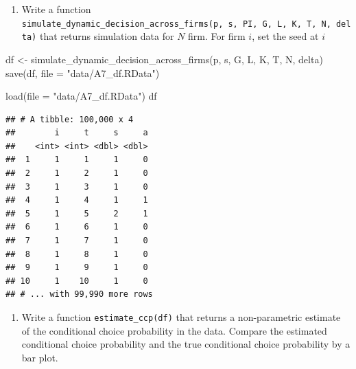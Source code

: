 \documentclass[
]{book}
\newenvironment{Shaded}{\begin{snugshade}}{\end{snugshade}}
\newcommand{\AttributeTok}[1]{\textcolor[rgb]{0.77,0.63,0.00}{#1}}
\newcommand{\FunctionTok}[1]{\textcolor[rgb]{0.00,0.00,0.00}{#1}}
\newcommand{\NormalTok}[1]{#1}
\newcommand{\OtherTok}[1]{\textcolor[rgb]{0.56,0.35,0.01}{#1}}
\newcommand{\StringTok}[1]{\textcolor[rgb]{0.31,0.60,0.02}{#1}}
\providecommand{\tightlist}{%
  \setlength{\itemsep}{0pt}\setlength{\parskip}{0pt}}
\begin{document}
\begin{enumerate}
\def\labelenumi{\arabic{enumi}.}
\setcounter{enumi}{6}
\tightlist
\item
  Write a function \texttt{simulate\_dynamic\_decision\_across\_firms(p,\ s,\ PI,\ G,\ L,\ K,\ T,\ N,\ delta)} that returns simulation data for \(N\) firm. For firm \(i\), set the seed at \(i\)
\end{enumerate}

\begin{Shaded}
\begin{Highlighting}[]
\NormalTok{df }\OtherTok{\textless{}{-}} \FunctionTok{simulate\_dynamic\_decision\_across\_firms}\NormalTok{(p, s,  G, L, K, T, N, delta)}
\FunctionTok{save}\NormalTok{(df, }\AttributeTok{file =} \StringTok{"data/A7\_df.RData"}\NormalTok{)}
\end{Highlighting}
\end{Shaded}

\begin{Shaded}
\begin{Highlighting}[]
\FunctionTok{load}\NormalTok{(}\AttributeTok{file =} \StringTok{"data/A7\_df.RData"}\NormalTok{)}
\NormalTok{df}
\end{Highlighting}
\end{Shaded}

\begin{verbatim}
## # A tibble: 100,000 x 4
##        i     t     s     a
##    <int> <int> <dbl> <dbl>
##  1     1     1     1     0
##  2     1     2     1     0
##  3     1     3     1     0
##  4     1     4     1     1
##  5     1     5     2     1
##  6     1     6     1     0
##  7     1     7     1     0
##  8     1     8     1     0
##  9     1     9     1     0
## 10     1    10     1     0
## # ... with 99,990 more rows
\end{verbatim}

\begin{enumerate}
\def\labelenumi{\arabic{enumi}.}
\setcounter{enumi}{7}
\tightlist
\item
  Write a function \texttt{estimate\_ccp(df)} that returns a non-parametric estimate of the conditional choice probability in the data. Compare the estimated conditional choice probability and the true conditional choice probability by a bar plot.
\end{enumerate}
\end{document}
